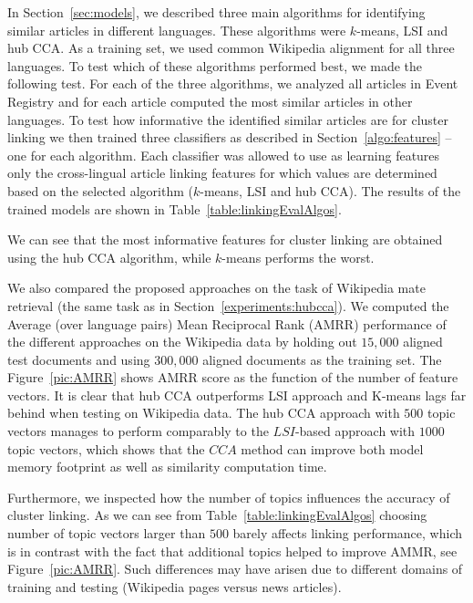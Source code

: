 \documentclass[twoside,11pt]{article}
\begin{document}
In Section~\ref{sec:models}, we  described three main algorithms for identifying similar articles in different languages. These algorithms were $k$-means, LSI and hub CCA. As a training set, we used common Wikipedia alignment for all three languages. To test which of these algorithms performed best, we made the following test. For each of the three algorithms, we analyzed all articles in Event Registry and for each article computed the most similar articles in other languages. To test how informative the identified similar articles are for cluster linking we then trained three classifiers as described in Section~\ref{algo:features} -- one for each algorithm. Each classifier was allowed to use as learning features only the cross-lingual article linking features for which values are determined based on the selected algorithm ($k$-means, LSI and hub CCA). The results of the trained models are shown in Table~\ref{table:linkingEvalAlgos}.

We can see that the most informative features for cluster linking are obtained using the hub CCA algorithm, while $k$-means performs the worst.

We also compared the proposed approaches on the task of Wikipedia mate retrieval (the same task as in Section~\ref{experiments:hubcca}). We computed the Average (over language pairs) Mean Reciprocal Rank (AMRR)   performance of the different approaches on the  Wikipedia data by holding out $15,000$ aligned test documents and using $300,000$ aligned documents as the training set. The Figure~\ref{pic:AMRR} shows AMRR score as the function of the number of feature vectors. It is clear that hub CCA outperforms LSI approach and K-means lags far behind when testing on Wikipedia data. The hub CCA approach with $500$ topic vectors manages to perform comparably to the $LSI$-based approach with $1000$ topic vectors, which shows that the $CCA$ method can improve both model memory footprint as well as similarity computation time.

Furthermore, we inspected how the number of topics influences the accuracy of cluster linking. As we can see from Table~\ref{table:linkingEvalAlgos} choosing number of topic vectors larger than $500$ barely affects linking performance, which is in contrast with the fact that additional topics helped to improve AMMR, see Figure~\ref{pic:AMRR}. Such differences may have arisen due to different domains of training and testing (Wikipedia pages versus news articles).
\end{document}
